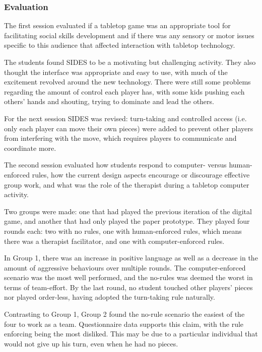 \documentclass[runningheads]{llncs}
\begin{document}
\subsubsection{Evaluation}
\par The first session evaluated if a tabletop game was an appropriate tool for facilitating social skills development and if there was any sensory or motor issues specific to this audience that affected interaction with tabletop technology.
\par The students found SIDES to be a motivating but challenging activity. They also thought the interface was appropriate and easy to use, with much of the excitement revolved around the new technology. There were still some problems regarding the amount of control each player has, with some kids pushing each others' hands and shouting, trying to dominate and lead the others.
\par For the next session SIDES was revised: turn-taking and controlled access (i.e. only each player can move their own pieces) were added to prevent other players from interfering with the move, which requires players to communicate and coordinate more.
\par The second session evaluated how students respond to computer- versus human-enforced rules, how the current design aspects encourage or discourage effective group work, and what was the role of the therapist during a tabletop computer activity.
\par Two groups were made: one that had played the previous iteration of the digital game, and another that had only played the paper prototype. They played four rounds each: two with no rules, one with human-enforced rules, which means there was a therapist facilitator, and one with computer-enforced rules.
\par In Group 1, there was an increase in positive language as well as a decrease in the amount of aggressive behaviours over multiple rounds. The computer-enforced scenario was the most well performed, and the no-rules was deemed the worst in terms of team-effort. By the last round, no student touched other players' pieces nor played order-less, having adopted the turn-taking rule naturally.
\par Contrasting to Group 1, Group 2 found the no-rule scenario the easiest of the four to work as a team. Questionnaire data supports this claim, with the rule enforcing being the most disliked. This may be due to a particular individual that would not give up his turn, even when he had no pieces.
\end{document}
